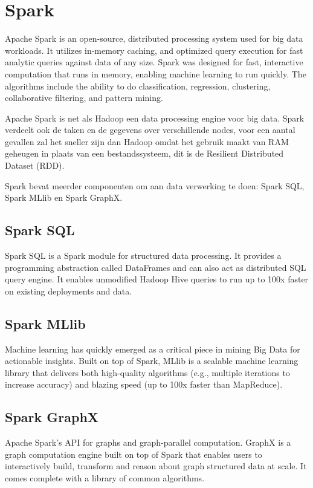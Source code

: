 \section{Spark}
Apache Spark is an open-source, distributed processing system used for big data workloads. It utilizes in-memory caching, and optimized query execution for fast analytic queries against data of any size.
Spark was designed for fast, interactive computation that runs in memory, enabling machine learning to run quickly. The algorithms include the ability to do classification, regression, clustering, collaborative filtering, and pattern mining.\autocite{AwsAmazon2023a}

Apache Spark is net als Hadoop een data processing engine voor big data. Spark verdeelt ook de taken en de gegevens over verschillende nodes, voor een aantal gevallen zal het sneller zijn dan Hadoop omdat het gebruik maakt van RAM geheugen in plaats van een bestandssysteem, dit is de Resilient Distributed Dataset (RDD).

Spark bevat meerder componenten om aan data verwerking te doen: Spark SQL, Spark MLlib en Spark GraphX.

\subsection{Spark SQL}
Spark SQL is a Spark module for structured data processing. It provides a programming abstraction called DataFrames and can also act as distributed SQL query engine. It enables unmodified Hadoop Hive queries to run up to 100x faster on existing deployments and data.\autocite{databricks2023}

\subsection{Spark MLlib}
Machine learning has quickly emerged as a critical piece in mining Big Data for actionable insights. Built on top of Spark, MLlib is a scalable machine learning library that delivers both high-quality algorithms (e.g., multiple iterations to increase accuracy) and blazing speed (up to 100x faster than MapReduce).\autocite{databricks2023}

\subsection{Spark GraphX}
Apache Spark's API for graphs and graph-parallel computation.
GraphX is a graph computation engine built on top of Spark that enables users to interactively build, transform and reason about graph structured data at scale. It comes complete with a library of common algorithms.\autocite{databricks2023}

